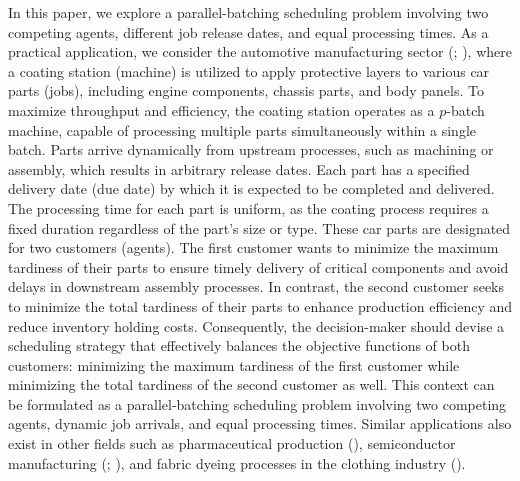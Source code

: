 \documentclass[12pt]{article}
\begin{document}
\begin{sloppypar}
In this paper, we explore a parallel-batching scheduling problem involving two competing agents, different job release dates, and equal processing times. As a practical application, we consider the automotive manufacturing sector (\citealp{Streitberger20082014Wiley}; \citealp{Akafuah2016Coatings}), where a coating station (machine) is utilized to apply protective layers to various car parts (jobs), including engine components, chassis parts, and body panels. To maximize throughput and efficiency, the coating station operates as a $p$-batch machine, capable of processing multiple parts simultaneously within a single batch. Parts arrive dynamically from upstream processes, such as machining or assembly, which results in arbitrary release dates. Each part has a specified delivery date (due date) by which it is expected to be completed and delivered. The processing time for each part is uniform, as the coating process requires a fixed duration regardless of the part's size or type. These car parts are designated for two customers (agents). The first customer wants to minimize the maximum tardiness of their parts to ensure timely delivery of critical components and avoid delays in downstream assembly processes. In contrast, the second customer seeks to minimize the total tardiness of their parts to enhance production efficiency and reduce inventory holding costs. Consequently, the decision-maker should devise a scheduling strategy that effectively balances the objective functions of both customers: minimizing the maximum tardiness of the first customer while minimizing the total tardiness of the second customer as well. This context can be formulated as a parallel-batching scheduling problem involving two competing agents, dynamic job arrivals, and equal processing times. Similar applications also exist in other fields such as pharmaceutical production (\citealp{MisraMaravelias2022Springer}), semiconductor manufacturing (\citealp{LeeUzsoy1999IJPR}; \citealp{RaniaMathirajan2023IJPR}), and fabric dyeing processes in the clothing industry (\citealp{LeiDai2024IJPR}). 


\end{sloppypar}
\end{document}
